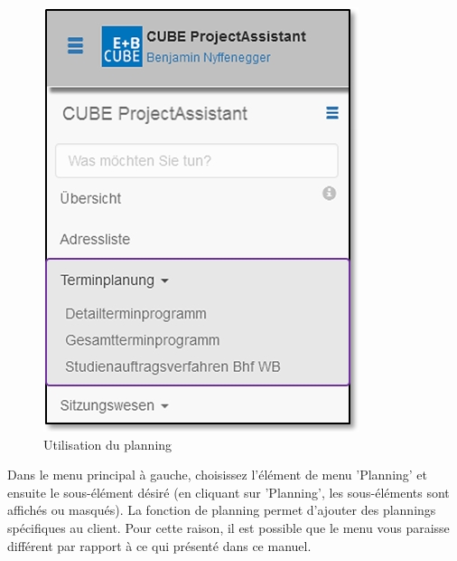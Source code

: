 \begin{figure}   %
  \vspace{-35pt}      %
  \begin{center}
    \includegraphics[width=1\linewidth]{../chapters/04_Terminplanung/pictures/4-1_Menu_Terminplanung.jpg}
  \end{center}
  \vspace{-20pt}
  \caption{Utilisation du planning}
  \vspace{-10pt}
\end{figure}

Dans le menu principal à gauche, choisissez l'élément de menu 'Planning' et ensuite le sous-élément désiré (en cliquant sur 'Planning', les sous-éléments sont affichés ou masqués). La fonction de planning permet d'ajouter des plannings spécifiques au client. Pour cette raison, il est possible que le menu vous paraisse différent par rapport à ce qui présenté dans ce manuel.

